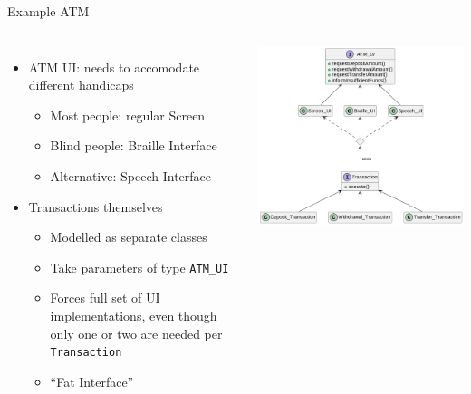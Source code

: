 
\begin{frame}{Example ATM}
%
\begin{columns}
\begin{itemize}
\item ATM UI: needs to accomodate different handicaps
	\begin{itemize}
	\item Most people: regular Screen
	\item Blind people: Braille Interface
	\item Alternative: Speech Interface
	\end{itemize}
\item Transactions themselves
	\begin{itemize}
	\item Modelled as separate classes
	\item Take parameters of type \texttt{ATM\_UI}
	\item[\Thus] Forces full set of UI implementations, even though only one or two are needed per \texttt{Transaction}
	\item \enquote{Fat Interface}
	\end{itemize}
\end{itemize}
%
\includegraphics[width=\linewidth]{./gfx/17-uml-atm-isp_violation}
\end{columns}
%
\end{frame}

